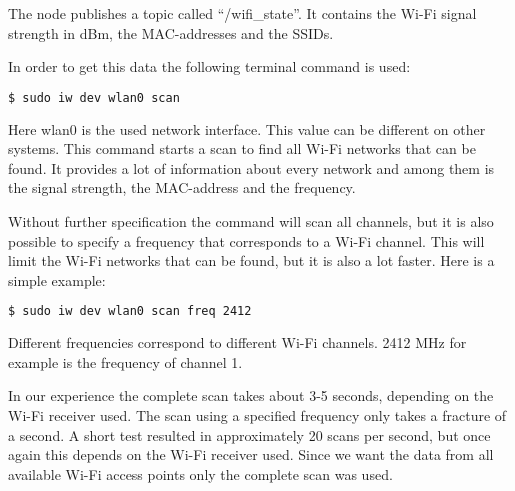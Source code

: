 The node publishes a topic called ``/wifi\_state''. It contains the Wi-Fi signal strength in dBm, the MAC-addresses and the SSIDs. 

In order to get this data the following terminal command is used:
\begin{lstlisting}[language=bash, basicstyle=\small]
  $ sudo iw dev wlan0 scan 
\end{lstlisting}
Here wlan0 is the used network interface. This value can be different on other systems. This command starts a scan to find all Wi-Fi networks that can be found. It provides a lot of information about every network and among them is the signal strength, the MAC-address and the frequency.

Without further specification the command will scan all channels, but it is also possible to specify a frequency that corresponds to a Wi-Fi channel. This will limit the Wi-Fi networks that can be found, but it is also a lot faster. Here is a simple example:
\begin{lstlisting}[language=bash, basicstyle=\small]
  $ sudo iw dev wlan0 scan freq 2412
\end{lstlisting}
Different frequencies correspond to different Wi-Fi channels. 2412 MHz for example is the frequency of channel 1. 

In our experience the complete scan takes about 3-5 seconds, depending on the Wi-Fi receiver used. The scan using a specified frequency only takes a fracture of a second. A short test resulted in approximately 20 scans per second, but once again this depends on the Wi-Fi receiver used. Since we want the data from all available Wi-Fi access points only the complete scan was used.

